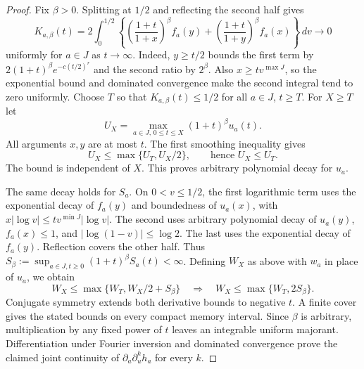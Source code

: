 \begin{proof}
Fix $\beta>0$. Splitting at $1/2$ and reflecting the second half gives
\[
 K_{a,\beta}(t)=2\int_0^{1/2}
 \left\{\left(\frac{1+t}{1+x}\right)^\beta f_a(y)
       +\left(\frac{1+t}{1+y}\right)^\beta f_a(x)\right\}\,dv
 \longrightarrow0
\]
uniformly for $a\in J$ as $t\to\infty$.
Indeed, $y\ge t/2$ bounds the first term by
$2(1+t)^\beta e^{-c(t/2)^r}$ and the second ratio by $2^\beta$.
Also $x\ge tv^{\max J}$, so the exponential bound and dominated
convergence make the second integral tend to zero uniformly.
Choose $T$ so that $K_{a,\beta}(t)\le1/2$ for all $a\in J$, $t\ge T$.
For $X\ge T$ let
\[
 U_X=\max_{a\in J,\,0\le t\le X}(1+t)^\beta u_a(t).
\]
All arguments $x,y$ are at most $t$. The first smoothing inequality gives
\[
 U_X\le\max\{U_T,U_X/2\},\qquad\text{hence }U_X\le U_T.
\]
The bound is independent of $X$. This proves arbitrary polynomial decay for $u_a$.

The same decay holds for $S_a$. On $0<v\le1/2$, the first
logarithmic term uses the exponential decay of $f_a(y)$ and boundedness
of $u_a(x)$, with $x|\log v|\le tv^{\min J}|\log v|$.
The second uses arbitrary polynomial decay of $u_a(y)$,
$f_a(x)\le1$, and $|\log(1-v)|\le\log2$. The last uses the
exponential decay of $f_a(y)$. Reflection covers the other half.
Thus $S_\beta:=\sup_{a\in J,t\ge0}(1+t)^\beta S_a(t)<\infty$.
Defining $W_X$ as above with $w_a$ in place of $u_a$, we obtain
\[
 W_X\le\max\{W_T,W_X/2+S_\beta\}
 \quad\Longrightarrow\quad W_X\le\max\{W_T,2S_\beta\}.
\]
Conjugate symmetry extends both derivative bounds to negative $t$.
A finite cover gives the stated bounds on every compact memory interval.
Since $\beta$ is arbitrary, multiplication by any fixed power of $t$
leaves an integrable uniform majorant. Differentiation under Fourier
inversion and dominated convergence prove the claimed joint continuity
of $\partial_a\partial_u^k h_a$ for every $k$.
\end{proof}
